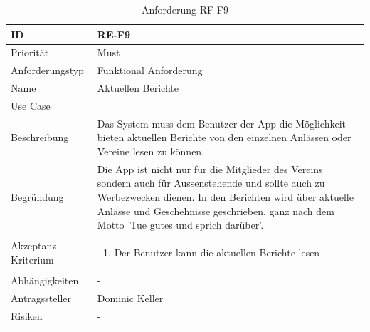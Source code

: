 \begin{table}[ht]
\centering
  \begin{tabular}{ l | p{8cm} }
	\hline
	\rowcolor{gray}
	ID 			&	\textbf{RE-F9}\\ \hline
	Priorität 		&	Must\\ \hline
	Anforderungstyp	&	Funktional Anforderung\\ \hline
	Name 			&	Aktuellen Berichte\\ \hline
	Use Case 		&	\nameref{table:use_case_6}\\ \hline
	Beschreibung 	&	Das System muss dem Benutzer der App die Möglichkeit bieten aktuellen Berichte von den einzelnen Anlässen oder Vereine lesen zu können.\\ \hline
	Begründung 		&	Die App ist nicht nur für die Mitglieder des Vereins sondern auch für Aussenstehende und sollte auch zu Werbezwecken dienen. In den Berichten wird über aktuelle Anlässe und Geschehnisse geschrieben, ganz nach dem Motto 'Tue gutes und sprich darüber'.\\ \hline
	Akzeptanz Kriterium	&	\begin{enumerate}
					\item Der Benutzer kann die aktuellen Berichte lesen
					\end{enumerate}
					\\ \hline
	Abhängigkeiten 	&	-\\ \hline
	Antragssteller 	&	Dominic Keller\\ \hline
	Risiken	 	&	-
  \end{tabular}
   \caption{Anforderung RF-F9}\label{table:req_9}
\end{table}


